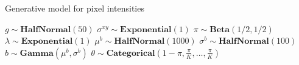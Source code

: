 \algrenewcommand{}
\begin{algorithm}
\caption{Generative model for pixel intensities}
\label{alg:pseudocode}
\begin{algorithmic}[1]
\State $g \sim \mathbf{HalfNormal}(50)$
\State $\sigma^{xy} \sim \mathbf{Exponential}(1)$
\State $\pi \sim \mathbf{Beta}(1/2, 1/2)$
\State $\lambda \sim \mathbf{Exponential}(1)$
    \State $\mu^b \sim \mathbf{HalfNormal}(1000)$
    \State $\sigma^b \sim \mathbf{HalfNormal}(100)$
        \State $b \sim \mathbf{Gamma}(\mu^b, \sigma^b)$
        \State $\theta \sim \mathbf{Categorical}\left(1 - \pi, \frac{\pi}{K}, \dots, \frac{\pi}{K}\right)$
        

\end{algorithmic}
\end{algorithm}
